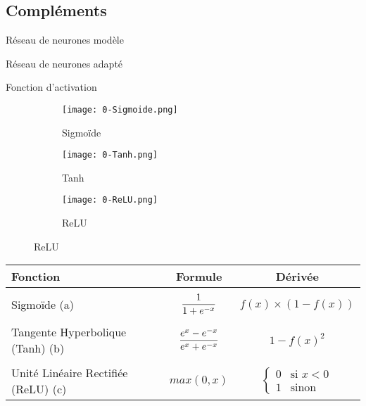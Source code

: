 \subsection{Compléments}



\begin{frame}{Réseau de neurones modèle}
    
\end{frame}


\begin{frame}{Réseau de neurones adapté}
    
\end{frame}

\begin{frame}{Fonction d'activation}
	\begin{figure}
		\begin{subfigure}[]{0.3\textwidth}
			\texttt{[image: 0-Sigmoide.png]}
			\caption{Sigmoïde}
		\end{subfigure}
		\begin{subfigure}[]{0.3\textwidth}
			\texttt{[image: 0-Tanh.png]}
			\caption{Tanh}
		\end{subfigure}
		\begin{subfigure}[]{0.3\textwidth}
			\texttt{[image: 0-ReLU.png]}
			\caption{ReLU}
		\end{subfigure}
	\end{figure}
	\begin{block}{}
		\centering
		\begin{tabular}{ l || c | c | }
			Fonction                            & Formule                                          & Dérivée                                    \\ \hline \\
			Sigmoïde (a)                        & $\mathlarger{\frac{1}{1+e^{-x}}}$                & $f(x) \times (1-f(x))$                     \\ \\
			Tangente Hyperbolique (Tanh) (b)    & $\mathlarger{\frac{e^{x}-e^{-x}}{e^{x}+e^{-x}}}$ & $1-f(x)^2$                                 \\ \\
			Unité Linéaire Rectifiée (ReLU) (c) & $max(0, x)$                                      & $ \left\{\begin{array}{ll}
					0 & \mbox{si } x<0 \\
					1 & \mbox{sinon }\end{array}\right.$ \\
		\end{tabular}
	\end{block}
\end{frame}